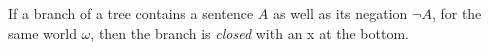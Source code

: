 \vspace{10mm}\noindent%
\begin{minipage}{0.33\textwidth}\centering
{}
\end{minipage}
\begin{minipage}{0.33\textwidth}\centering
{}
\end{minipage}
\begin{minipage}{0.33\textwidth}\centering
{}
\end{minipage}

\vspace{10mm}\noindent%
\begin{minipage}{0.33\textwidth}\centering
{}
\end{minipage}

\vspace{5mm}

If a branch of a tree contains a sentence $A$ as well as its negation $\neg A$,
for the same world $\omega$, then the branch is \emph{closed} with an {\sffamily
  x} at the bottom.


